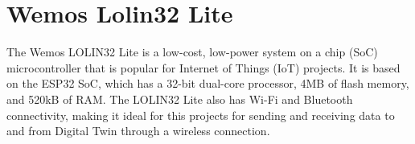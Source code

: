 
\section{Wemos Lolin32 Lite}

The Wemos LOLIN32 Lite is a low-cost, low-power system on a chip (SoC)  microcontroller that is popular for Internet of Things (IoT) projects. It is based on the ESP32 SoC, which has a 32-bit dual-core processor, 4MB of flash memory, and 520kB of RAM. The LOLIN32 Lite also has Wi-Fi and Bluetooth connectivity, making it ideal for this projects for sending and receiving data to and from Digital Twin through a wireless connection.


       
        
       



